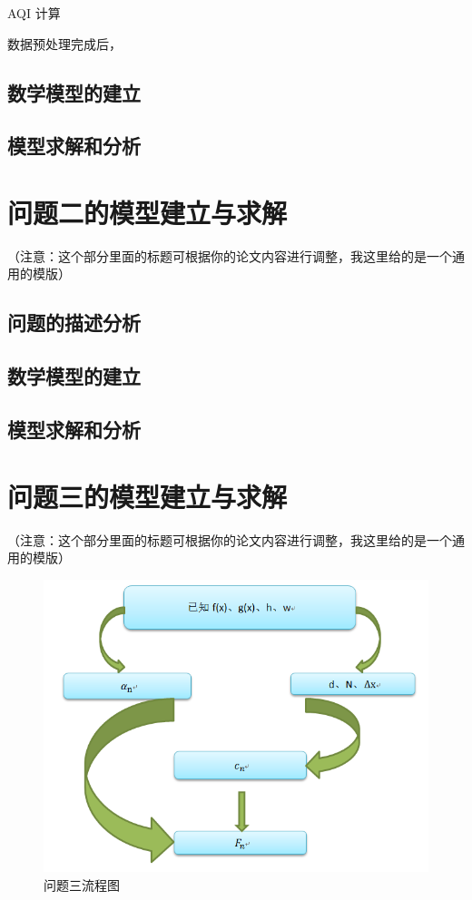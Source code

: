 \documentclass[a4paper,10pt]{my_paper}
\numberwithin{equation}{section}
\begin{document}
AQI 计算


数据预处理完成后，


\subsection{数学模型的建立}

\subsection{模型求解和分析}

\section{问题二的模型建立与求解}
（注意：这个部分里面的标题可根据你的论文内容进行调整，我这里给的是一个通用的模版）

\subsection{问题的描述分析}

\subsection{数学模型的建立}

\subsection{模型求解和分析}


\section{问题三的模型建立与求解}
（注意：这个部分里面的标题可根据你的论文内容进行调整，我这里给的是一个通用的模版）
\begin{figure}[!h]
    \centering
    \includegraphics[width=.7\textwidth]{1.png}
    \caption{问题三流程图}
\end{figure}
\end{document}
